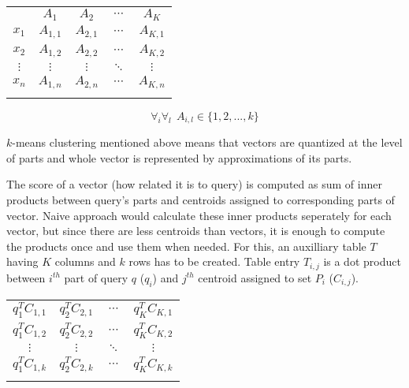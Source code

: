 \begin{center}
\renewcommand{\arraystretch}{1.2}
\begin{tabular}{c|c|c|c|c|}
\multicolumn{1}{r}{} & \multicolumn{1}{c}{$A_{1}$} & \multicolumn{1}{c}{$A_{2}$}
& \multicolumn{1}{c}{$\cdots$} & \multicolumn{1}{c}{$A_{K}$} \\
\hhline{~----}
$x_1$ & $A_{1,1}$ & $A_{2,1}$ & $\cdots$ & $A_{K,1}$ \\
\hhline{~----}
$x_2$ & $A_{1,2}$ & $A_{2,2}$ & $\cdots$ & $A_{K,2}$ \\
\hhline{~----}
$\vdots$ & $\vdots$ & $\vdots$ & $\ddots$ & $\vdots$ \\
\hhline{~----}
$x_n$ & $A_{1,n}$ & $A_{2,n}$ & $\cdots$ & $A_{K,n}$ \\
\hhline{~----}
\end{tabular}
\end{center}

\begin{equation*}
\forall_i \forall_l\ \  A_{i,l} \in \{1,2,...,k\}
\end{equation*}

$k$-means clustering mentioned above means that vectors are quantized at the level of parts
and whole vector is represented by approximations of its parts.
\par
The score of a vector (how related it is to query) is computed as sum of inner products
between query's parts and centroids assigned to corresponding parts of vector.
Naive approach would calculate these inner products seperately for each vector,
but since there are less centroids than vectors, it is enough to compute the products once
and use them when needed.
For this, an auxilliary table $T$ having $K$ columns and $k$ rows has to be created.
Table entry $T_{i,j}$ is a dot product between $i^{th}$ part of query $q$ ($q_i$) and $j^{th}$
centroid assigned to set $P_i$ ($C_{i,j}$).

\renewcommand{\arraystretch}{1.6}
\begin{center}
\begin{tabular}{|c|c|c|c|}
\hhline{----}
$ q_1^T C_{1,1} $ & $ q_2^T C_{2,1} $ & $ \cdots $ & $ q_K^T C_{K,1} $\\
\hhline{----}
$ q_1^T C_{1,2} $ & $ q_2^T C_{2,2} $ & $ \cdots $ & $ q_K^T C_{K,2} $\\
\hhline{----}
$ \vdots $ & $ \vdots $ & $ \ddots $ & $ \vdots $\\
\hhline{----}
$ q_1^T C_{1,k} $ & $ q_2^T C_{2,k} $ & $ \cdots $ & $ q_K^T C_{K,k} $\\
\hhline{----}
\end{tabular}
\end{center}

